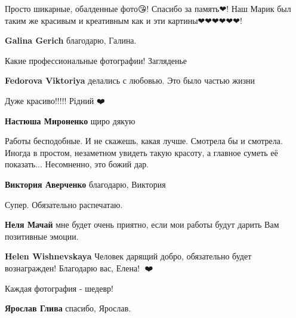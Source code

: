  
 
 
 
 

\qqSecCmt


Просто шикарные, обалденные фото😘! Спасибо за память❤! Наш Марик был таким же
красивым и креативным как и эти картины❤❤❤❤❤❤!

\textbf{Galina Gerich} благодарю, Галина.


Какие профессиональные фотографии! Загляденье

\textbf{Fedorova Viktoriya} делались с любовью. Это было частью жизни


Дуже красиво!!!!! Рідний ❤️

\textbf{Настюша Мироненко} щиро дякую


Работы бесподобные. И не скажешь, какая лучше. Смотрела бы и смотрела. Иногда в
простом, незаметном увидеть такую красоту, а главное суметь её показать...
Несомненно, это божий дар.

\textbf{Виктория Аверченко} благодарю, Виктория


Супер. Обязательно распечатаю.

\begin{itemize} %
\textbf{Неля Мачай} мне будет очень приятно, если мои работы будут дарить Вам позитивные эмоции.

\textbf{Helen Wishnevskaya} Человек дарящий добро, обязательно будет вознагражден!
Благодарю вас, Елена! 🤗❤️
\end{itemize} %


Каждая фотография - шедевр!

\textbf{Ярослав Глива} спасибо, Ярослав.


